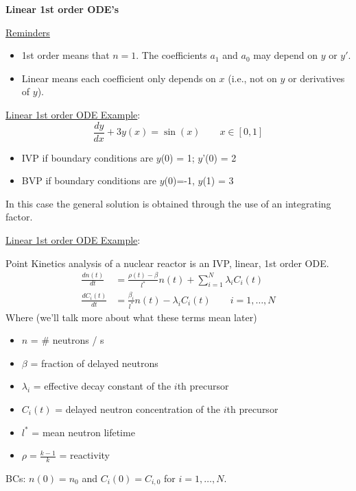 \documentclass[12pt]{article}
\begin{document}
\vspace*{1em}
\textbf{Linear 1st order ODE's}

\underline{Reminders}
\begin{itemize}
\item 1st order means that $n=1$. The  coefficients $a_1$ and $a_0$ may depend on $y$ or $y'$.
\item Linear means each coefficient only depends on $x$ (i.e., not on $y$ or derivatives of $y$).
\end{itemize}

\underline{Linear 1st order ODE Example}:
\begin{equation}
\frac{dy}{dx} + 3y(x) = \sin(x) \qquad x \in [0, 1] \nonumber
\end{equation}
%
\begin{itemize}
\item IVP if boundary conditions are $y$(0) = 1; $y$'(0) = 2
\item BVP if boundary conditions are $y$(0)=-1, $y$(1) = 3 
\end{itemize}
%
In this case the general solution is obtained through the use of an integrating factor.

\vspace*{1em}
\noindent \underline{Linear 1st order ODE Example}:

Point Kinetics analysis of a nuclear reactor is an IVP, linear, 1st order ODE.
%
\begin{align}
\frac{dn(t)}{dt} &= \frac{\rho(t) - \beta}{l^*}n(t) + \sum_{i=1}^{N} \lambda_i C_i(t) \nonumber \\
%
\frac{dC_i(t)}{dt} &= \frac{\beta_i}{l^*}n(t) - \lambda_i C_i(t) \qquad i=1,\dots,N \nonumber
\end{align}
%
Where (we'll talk  more about what these terms mean later)
%
\begin{itemize}
\item $n$ = \# neutrons / s
\item $\beta$ = fraction of delayed neutrons
\item $\lambda_i$ = effective decay constant of the $i$th precursor
\item $C_i(t)$ = delayed neutron concentration of the $i$th precursor
\item $l^*$ = mean neutron lifetime
\item $\rho = \frac{k-1}{k}$ = reactivity
\end{itemize}
%
BCs: $n(0) = n_0$ and $C_i(0) = C_{i,0}$ for $i=1,\dots,N$.
\end{document}
